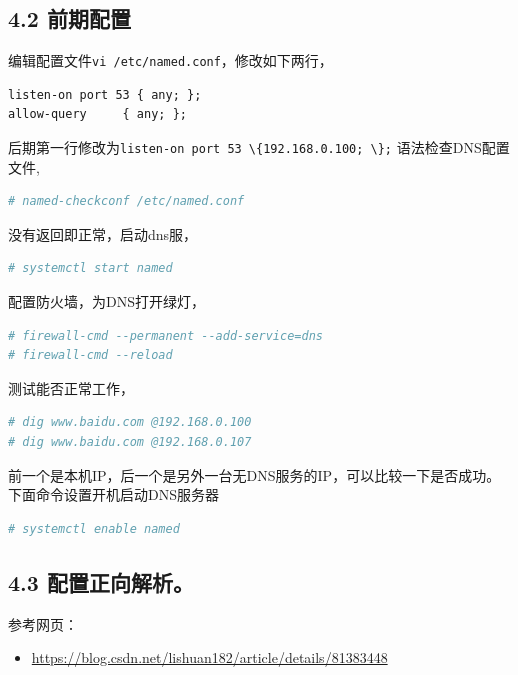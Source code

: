 \documentclass[doctor,openright,twoside]{sjtuthesis}
\providecommand{\tightlist}{%
    \setlength{\itemsep}{0pt}\setlength{\parskip}{0pt}}
\newcommand{\passthrough}[1]{#1}
\theoremstyle{plain}
\theoremstyle{definition}
\theoremstyle{remark}
\theoremstyle{ocrenumbox}
\theoremstyle{plain}
\begin{document}
\hypertarget{section-136}{%
\subsection{4.2 前期配置}\label{section-136}}

编辑配置文件\passthrough{\lstinline!vi /etc/named.conf!}，修改如下两行，

\begin{lstlisting}
listen-on port 53 { any; };
allow-query     { any; };
\end{lstlisting}

后期第一行修改为\passthrough{\lstinline!listen-on port 53 \{192.168.0.100; \};!}
语法检查DNS配置文件,

\begin{lstlisting}[language=bash]
# named-checkconf /etc/named.conf
\end{lstlisting}

没有返回即正常，启动dns服，

\begin{lstlisting}[language=bash]
# systemctl start named
\end{lstlisting}

配置防火墙，为DNS打开绿灯，

\begin{lstlisting}[language=bash]
# firewall-cmd --permanent --add-service=dns
# firewall-cmd --reload
\end{lstlisting}

测试能否正常工作，

\begin{lstlisting}[language=bash]
# dig www.baidu.com @192.168.0.100
# dig www.baidu.com @192.168.0.107
\end{lstlisting}

前一个是本机IP，后一个是另外一台无DNS服务的IP，可以比较一下是否成功。下面命令设置开机启动DNS服务器

\begin{lstlisting}[language=bash]
# systemctl enable named
\end{lstlisting}

\hypertarget{section-137}{%
\subsection{4.3 配置正向解析。}\label{section-137}}

参考网页：

\begin{itemize}
\tightlist
\item
  \url{https://blog.csdn.net/lishuan182/article/details/81383448}
\end{itemize}
\end{document}
